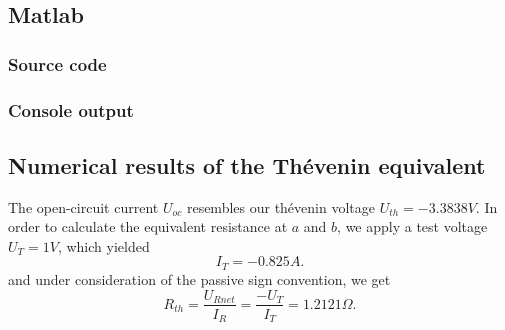 \documentclass[a4paper]{article}
\begin{document}
\subsection{Matlab}
\subsubsection{Source code}
  
\subsubsection{Console output}
  
\vspace{2mm}
\subsection{Numerical results of the Thévenin equivalent}
The open-circuit current $U_{oc}$ resembles our thévenin voltage $U_{th} = -3.3838 V$.
In order to calculate the equivalent resistance at $a$ and $b$, we apply a test voltage $U_{T} = 1V$, which yielded
\[
I_{T} = -0.825A
.\] 
and under consideration of the passive sign convention, we get
\[
R_{th} = \frac{U_{Rnet}}{I_{R}} = \frac{-U_{T}}{I_{T}}= 1.2121\Omega
.\]
\clearpage
\end{document}
